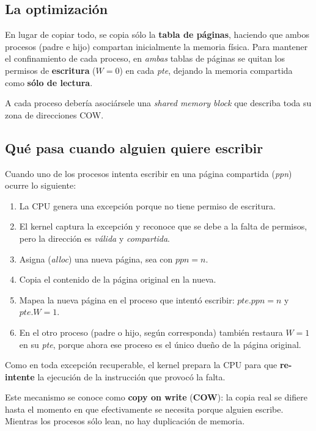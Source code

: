 \documentclass[11pt,a4paper]{article}
\begin{document}
\subsection{La optimización}

En lugar de copiar todo, se copia sólo la \textbf{tabla de páginas},
haciendo que ambos procesos (padre e hijo) compartan inicialmente la
memoria física. Para mantener el confinamiento de cada proceso, en
\emph{ambas} tablas de páginas se quitan los permisos de
\textbf{escritura} ($W=0$) en cada \emph{pte}, dejando la memoria
compartida como \textbf{sólo de lectura}.

A cada proceso debería asociársele una \emph{shared memory block} que
describa toda su zona de direcciones COW.

\subsection{Qué pasa cuando alguien quiere escribir}

Cuando uno de los procesos intenta escribir en una página compartida
(\emph{ppn}) ocurre lo siguiente:

\begin{enumerate}[leftmargin=*]
    \item La CPU genera una excepción porque no tiene permiso de
        escritura.
    \item El kernel captura la excepción y reconoce que se debe a la
        falta de permisos, pero la dirección es \emph{válida} y
        \emph{compartida}.
    \item Asigna (\emph{alloc}) una nueva página, sea con $\textit{ppn}
        = n$.
    \item Copia el contenido de la página original en la nueva.
    \item Mapea la nueva página en el proceso que intentó escribir:
        $\textit{pte}.\textit{ppn} = n$ y $\textit{pte}.W = 1$.
    \item En el otro proceso (padre o hijo, según corresponda) también
        restaura $W=1$ en su \emph{pte}, porque ahora ese proceso es
        el único dueño de la página original.
\end{enumerate}

Como en toda excepción recuperable, el kernel prepara la CPU para que
\textbf{re-intente} la ejecución de la instrucción que provocó la
falta.

\begin{definicion}
Este mecanismo se conoce como \textbf{copy on write} (\textbf{COW}): la
copia real se difiere hasta el momento en que efectivamente se necesita
porque alguien escribe. Mientras los procesos sólo lean, no hay
duplicación de memoria.
\end{definicion}
\end{document}
